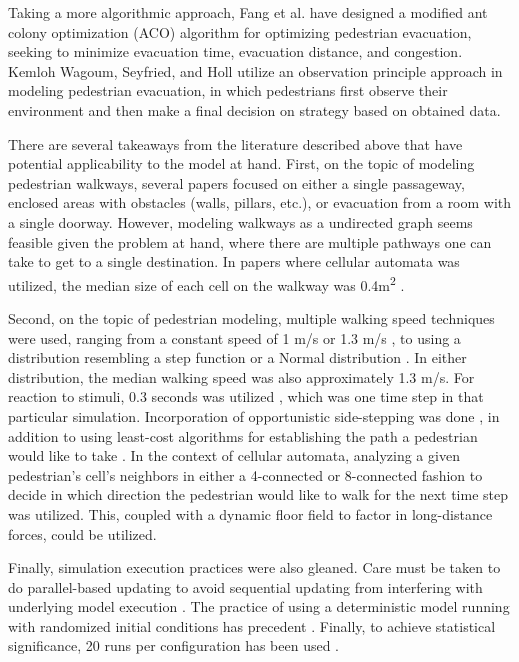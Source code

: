 \documentclass[12pt]{article}
\begin{document}
Taking a more algorithmic approach, Fang et al. \cite{fang2011hierarchical} have
designed a modified ant colony optimization (ACO) algorithm for optimizing
pedestrian evacuation, seeking to minimize evacuation time, evacuation distance,
and congestion. Kemloh Wagoum, Seyfried, and Holl \cite{kemloh2012modeling}
utilize an observation principle approach in modeling pedestrian evacuation,
in which pedestrians first observe their environment and then make a final
decision on strategy based on obtained data.

There are several takeaways from the literature described above that have
potential applicability to the model at hand. First, on the topic of modeling
pedestrian walkways, several papers focused on either a single passageway,
enclosed areas with obstacles (walls, pillars, etc.), or evacuation from a
room with a single doorway. However, modeling walkways as a undirected graph
\cite{fang2011hierarchical} seems feasible given the problem at hand, where
there are multiple pathways one can take to get to a single destination. In
papers where cellular automata was utilized, the median size of each cell on the
walkway was 0.4m\textsuperscript{2}
\cite{blue2001cellular,burstedde2001simulation,weifeng2003simulation}.

Second, on the topic of pedestrian modeling, multiple walking speed techniques
were used, ranging from a constant speed of 1 m/s \cite{weifeng2003simulation}
or 1.3 m/s \cite{burstedde2001simulation}, to using a distribution resembling a
step function \cite{blue2001cellular} or a Normal distribution
\cite{klupfel2005models}. In either distribution, the median walking speed was
also approximately 1.3 m/s. For reaction to stimuli, 0.3 seconds was utilized
\cite{burstedde2001simulation}, which was one time step in that particular
simulation. Incorporation of opportunistic side-stepping was done
\cite{blue2001cellular}, in addition to using least-cost algorithms for
establishing the path a pedestrian would like to take
\cite{fang2011hierarchical}. In the context of cellular automata, analyzing a
given pedestrian's cell's neighbors in either a 4-connected
\cite{weifeng2003simulation} or 8-connected fashion
\cite{burstedde2001simulation} to decide in which direction the pedestrian would
like to walk for the next time step was utilized. This, coupled with a dynamic
floor field \cite{burstedde2001simulation} to factor in long-distance forces,
could be utilized.

Finally, simulation execution practices were also gleaned. Care must be taken
to do parallel-based updating to avoid sequential updating from interfering with
underlying model execution \cite{blue2001cellular}. The practice of using
a deterministic model running with randomized initial conditions has precedent
\cite{biham1992self}. Finally, to achieve statistical significance, 20 runs per
configuration has been used \cite{blue2001cellular}.
\end{document}
